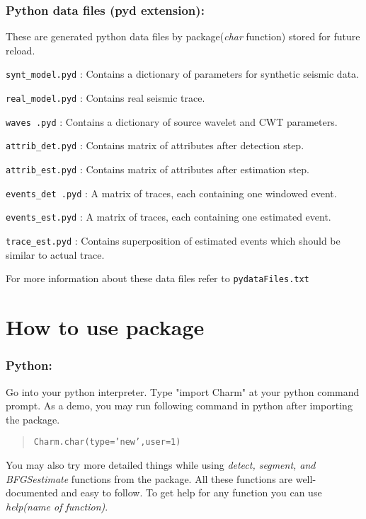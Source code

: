 \documentclass[12pt,titlepage]{article}
\begin{document}
\subsubsection*{Python data files (pyd extension):}
These are generated python data files by package(\textit{char}
function) stored for future reload.
\begin{description}
\item \texttt{synt\_model.pyd} : Contains a dictionary of parameters
  for synthetic seismic data.
\item \texttt{real\_model.pyd} :  Contains real seismic trace.
\item \texttt{waves .pyd} : Contains a dictionary of source wavelet
  and CWT parameters.
\item \texttt{attrib\_det.pyd} : Contains matrix of attributes after
  detection step.
\item \texttt{attrib\_est.pyd} : Contains matrix of attributes after
  estimation step.
\item \texttt{events\_det .pyd} : A matrix of traces, each containing
  one windowed event.
\item \texttt{events\_est.pyd} : A matrix of traces, each containing
  one estimated event.
\item \texttt{trace\_est.pyd} : Contains superposition of estimated
  events which should be similar to actual trace.
\end{description}
%
For more information about these data files refer to \texttt{pydataFiles.txt}
%
%
\section*{How to use package}
\subsubsection*{Python:}
Go into your python interpreter. Type "import Charm" at your python
command prompt. As a demo, you may run following command in python
after importing the package.
\begin{verse}
  \texttt{Charm.char(type='new',user=1)}
\end{verse}
%
You may also try more detailed things while using \emph{detect,
  segment, and BFGSestimate} functions from the package. All these
functions are well-documented and easy to follow. To get help for any
function you can use \emph{help(name of function)}.
\end{document}
